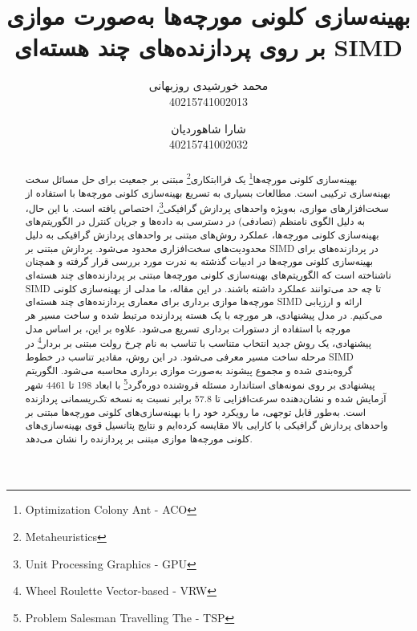 \documentclass[a4paper,10pt]{article}
\title{\huge بهینه‌سازی کلونی مورچه‌ها به‌صورت موازی بر روی پردازنده‌های چند هسته‌ای SIMD}
\author{محمد خورشیدی روزبهانی\\40215741002013 \and شارا شاهوردیان\\40215741002032}
\date{}
\begin{document}
    \maketitle


    \begin{abstract}
        
        بهینه‌سازی کلونی مورچه‌ها\footnote{\hspace{2pt}Optimization Colony Ant - ACO} یک فراابتکاری\footnote{\hspace{2pt}Metaheuristics} مبتنی بر جمعیت برای حل مسائل سخت بهینه‌سازی ترکیبی است. مطالعات بسیاری به تسریع بهینه‌سازی کلونی مورچه‌ها با استفاده از سخت‌افزارهای موازی، به‌ویژه واحدهای پردازش گرافیکی\footnote{\hspace{2pt}Unit Processing Graphics - GPU}، اختصاص یافته است. با این حال، به دلیل الگوی نامنظم (تصادفی) در دسترسی به داده‌ها و جریان کنترل در الگوریتم‌های بهینه‌سازی کلونی مورچه‌ها، عملکرد روش‌های مبتنی بر واحدهای پردازش گرافیکی به دلیل محدودیت‌های سخت‌افزاری محدود می‌شود. پردازش مبتنی بر SIMD در پردازنده‌های برای بهینه‌سازی کلونی مورچه‌ها در ادبیات گذشته به ندرت مورد بررسی قرار گرفته و همچنان ناشناخته است که الگوریتم‌های بهینه‌سازی کلونی مورچه‌ها مبتنی بر پردازنده‌های چند هسته‌ای SIMD تا چه حد می‌توانند عملکرد داشته باشند. در این مقاله، ما مدلی از بهینه‌سازی کلونی مورچه‌ها موازی برداری برای معماری پردازنده‌های چند هسته‌ای SIMD ارائه و ارزیابی می‌کنیم. در مدل پیشنهادی، هر مورچه با یک هسته پردازنده مرتبط شده و ساخت مسیر هر مورچه با استفاده از دستورات برداری تسریع می‌شود. علاوه بر این، بر اساس مدل پیشنهادی، یک روش جدید انتخاب متناسب با تناسب به نام چرخ رولت مبتنی بر بردار\footnote{\hspace{2pt}Wheel Roulette Vector-based - VRW} در مرحله ساخت مسیر معرفی می‌شود. در این روش، مقادیر تناسب در خطوط SIMD گروه‌بندی شده و مجموع پیشوند به‌صورت موازی برداری محاسبه می‌شود. الگوریتم پیشنهادی بر روی نمونه‌های استاندارد مسئله فروشنده دوره‌گرد\footnote{\hspace{2pt}Problem Salesman Travelling The - TSP} با ابعاد 198 تا 4461 شهر آزمایش شده و نشان‌دهنده سرعت‌افزایی تا 57.8 برابر نسبت به نسخه تک‌ریسمانی پردازنده است. به‌طور قابل توجهی، ما رویکرد خود را با بهینه‌سازی‌های کلونی مورچه‌ها مبتنی بر واحدهای پردازش گرافیکی با کارایی بالا مقایسه کرده‌ایم و نتایج پتانسیل قوی بهینه‌سازی‌های کلونی مورچه‌ها موازی مبتنی بر پردازنده را نشان می‌دهد.

    \end{abstract}
\end{document}
